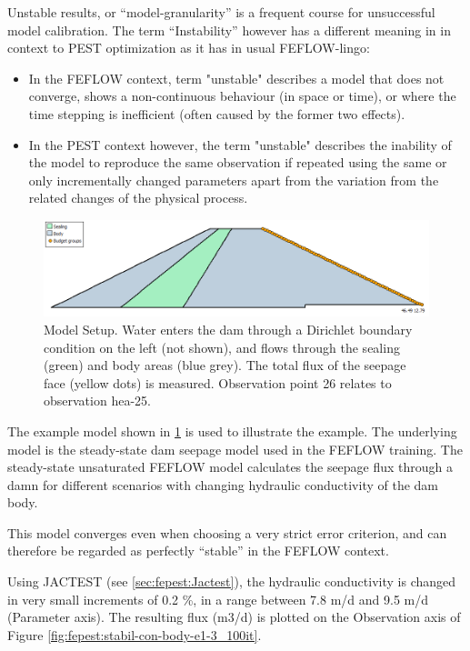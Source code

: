 Unstable results, or “model-granularity” is a frequent course for unsuccessful model calibration. The term “Instability” however has a different meaning in in context to PEST optimization as it has in usual FEFLOW-lingo:

\begin{itemize}
\item In the FEFLOW context, term "unstable" describes a model that does not converge, shows a non-continuous behaviour (in space or time), or where the time stepping is inefficient (often caused by the former two effects).

\item In the PEST context however, the term "unstable" describes the inability of the model to reproduce the same observation if repeated using the same or only incrementally changed parameters apart from the variation from the related changes of the physical process.
\end{itemize}

\begin{figure}
	\center
	\includegraphics[width=\columnwidth]{figures/model-setup.png}
\caption{Model Setup. Water enters the dam through a Dirichlet boundary condition on the left (not shown), and flows through the sealing (green) and body areas (blue grey). The total flux of the seepage face (yellow dots) is measured. Observation point 26 relates to observation hea-25.}
\label{fig:fepest:model-setup}
\end{figure}

The example model shown in \ref{fig:fepest:model-setup} is used to illustrate the example. The underlying model is the steady-state dam seepage model used in the FEFLOW training. The steady-state unsaturated FEFLOW model calculates the seepage flux through a damn for different scenarios with changing hydraulic conductivity of the dam body.

This model converges even when choosing a very strict error criterion, and can therefore be regarded as perfectly “stable” in the FEFLOW context.

Using JACTEST (see \ref{sec:fepest:Jactest}), the hydraulic conductivity is changed in very small increments of 0.2 \%, in a range between 7.8 m/d and 9.5 m/d (Parameter axis). The resulting flux (m3/d) is plotted on the Observation axis of Figure \ref{fig:fepest:stabil-con-body-e1-3_100it}. 

